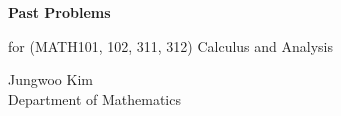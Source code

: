 \documentclass[11pt,oneside]{article}
\begin{document}
\thispagestyle{empty}

\begin{center}
  \vspace*{1.1cm}
  {\LARGE\bfseries Past Problems\par}
  \vspace{0.25cm}
  {\large for (MATH101, 102, 311, 312) Calculus and Analysis\par}
  \vspace{0.75cm}
  {\normalsize
  Jungwoo Kim\\
  Department of Mathematics\\
  \PohangUniversityOfScienceAndTechnology
  \par}
\end{center}

\vspace{1.6cm}
\tableofcontents
\thispagestyle{empty}





\end{document}
